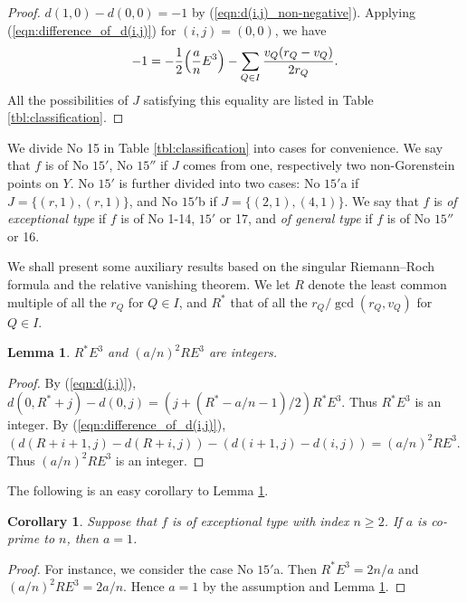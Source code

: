 \documentclass[a4paper,11pt]{amsart}
\newtheorem{lemma}[theorem]{Lemma}
\newtheorem{corollary}[theorem]{Corollary}
\theoremstyle{definition}
\theoremstyle{remark}
\numberwithin{equation}{section}
\begin{document}
\begin{proof}
$d(1,0)-d(0,0)=-1$ by (\ref{eqn:d(i,j)_non-negative}).
Applying (\ref{eqn:difference_of_d(i,j)}) for $(i,j)=(0,0)$, we have
\begin{align*}
-1=
-\frac{1}{2}\Bigl(\frac{a}{n}E^3\Bigr)-\sum_{Q \in I}\frac{v_Q(r_Q-v_Q)}{2r_Q}.
\end{align*}
All the possibilities of $J$ satisfying this equality are
listed in Table \ref{tbl:classification}.
\end{proof}

We divide No 15 in Table \ref{tbl:classification} into cases for convenience.
We say that $f$ is of No $\textrm{15}'$, No $\textrm{15}''$
if $J$ comes from one, respectively two non-Gorenstein points on $Y$.
No $\textrm{15}'$ is further divided into two cases:
No $\textrm{15}'$a if $J=\{(r, 1), (r, 1)\}$,
and No $\textrm{15}'$b if $J=\{(2, 1), (4, 1)\}$.
We say that $f$ is \textit{of exceptional type}
if $f$ is of No 1-14, $\textrm{15}'$ or 17,
and \textit{of general type}
if $f$ is of No $\textrm{15}''$ or 16.

We shall present some auxiliary results based on
the singular Riemann--Roch formula and the relative vanishing theorem.
We let $R$ denote the least common multiple of all the $r_Q$ for $Q\in I$,
and $R^*$ that of all the $r_Q/\gcd(r_Q, v_Q)$ for $Q\in I$.

\begin{lemma}\label{lem:integer}
$R^*E^3$ and $(a/n)^2RE^3$ are integers.
\end{lemma}

\begin{proof}
By (\ref{eqn:d(i,j)}),
$d(0,R^*+j)-d(0,j)=(j+(R^*-a/n-1)/2)R^*E^3$.
Thus $R^*E^3$ is an integer.
By (\ref{eqn:difference_of_d(i,j)}),
$(d(R+i+1,j)-d(R+i,j))-(d(i+1,j)-d(i,j))=(a/n)^2RE^3$.
Thus $(a/n)^2RE^3$ is an integer.
\end{proof}

The following is an easy corollary to Lemma \ref{lem:integer}.

\begin{corollary}\label{cor:a=1}
Suppose that $f$ is of exceptional type with index $n \ge 2$.
If $a$ is co-prime to $n$, then $a=1$.
\end{corollary}

\begin{proof}
For instance,
we consider the case No $\textrm{15}'$a.
Then $R^*E^3=2n/a$ and $(a/n)^2RE^3=2a/n$.
Hence $a=1$ by the assumption and Lemma \ref{lem:integer}.
\end{proof}
\end{document}
